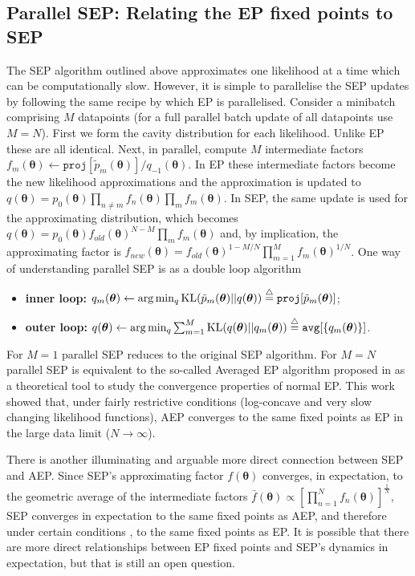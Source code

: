 \subsection{Parallel SEP: Relating the EP fixed points to SEP}
%
The SEP algorithm outlined above approximates one likelihood at a time which can be computationally slow. However, it is simple to parallelise the SEP updates by following the same recipe by which EP is parallelised. Consider a minibatch comprising $M$ datapoints (for a full parallel batch update of all datapoints use $M=N$). First we form the cavity distribution for each likelihood. Unlike EP these are all identical. Next, in parallel, compute $M$ intermediate factors $f_m(\bm{\theta}) \leftarrow \mathtt{proj}[\tilde{p}_m(\bm{\theta})] / q_{-1}(\bm{\theta})$. In EP these intermediate factors become the new likelihood approximations and the approximation is updated to $q(\bm{\theta}) = p_0(\bm{\theta}) \prod_{n \ne m} f_n(\bm{\theta}) \prod_{m} f_m(\bm{\theta}) $. In SEP, the same update is used for the approximating distribution, which becomes $q(\bm{\theta}) = p_0(\bm{\theta}) f_{old}(\bm{\theta})^{N-M} \prod_{m} f_m(\bm{\theta}) $ and, by implication, the approximating factor is $f_{new}(\bm{\theta}) = f_{old}(\bm{\theta})^{1-M/N} \prod_{m=1}^M f_m(\bm{\theta})^{1/N}$. One way of understanding parallel SEP is as a double loop algorithm 
%
\begin{itemize}
	\item \textbf{inner loop:} $q_m(\bm{\theta}) \leftarrow \arg\min_q \mathrm{KL}(\tilde{p}_m(\bm{\theta}) ||q(\bm{\theta})) \buildrel\triangle\over = \mathtt{proj}[\tilde{p}_m(\bm{\theta})]$; 
	\item \textbf{outer loop:} $q(\bm{\theta}) \leftarrow \arg\min_q \sum_{m=1}^M \mathrm{KL}(q(\bm{\theta}) ||q_m(\bm{\theta})) \buildrel\triangle\over = \mathtt{avg}[\{q_m(\bm{\theta})\}]$.
\end{itemize}
%
For $M=1$ parallel SEP reduces to the original SEP algorithm. For $M=N$ parallel SEP is equivalent to the so-called Averaged EP algorithm proposed in \cite{barthelme:aep} as a theoretical tool to study the convergence properties of normal EP. This work showed that, under fairly restrictive conditions (log-concave and very slow changing likelihood functions), AEP converges to the same fixed points as EP in the large data limit ($N \rightarrow \infty$).

There is another illuminating and arguable more direct connection between SEP and AEP. Since SEP's approximating factor $f(\bm{\theta})$ converges, in expectation, to the geometric average of the intermediate factors $\bar{f}(\bm{\theta}) \propto [\prod_{n=1}^N f_n(\bm{\theta})]^{\frac{1}{N}}$, SEP converges in expectation to the same fixed points as AEP, and therefore under certain conditions \cite{barthelme:aep}, to the same fixed points as EP. 
%
It is possible that there are more direct relationships between EP fixed points and SEP's dynamics in expectation, but that is still an open question.

